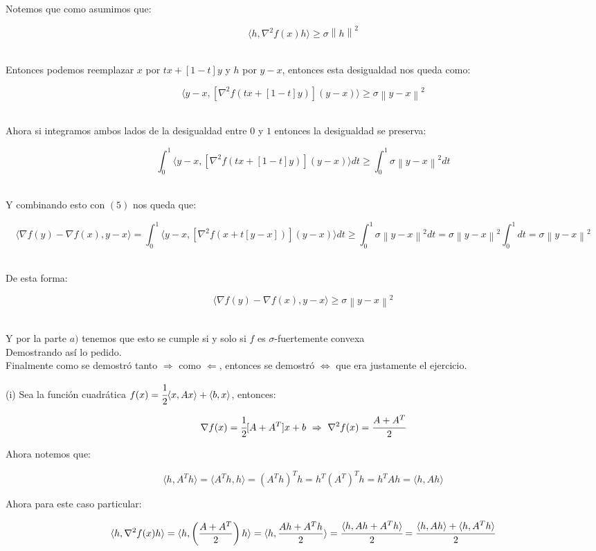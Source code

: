 \documentclass[11pt]{article}
\begin{document}
Notemos que como asumimos que:

\[  \langle h, \nabla^2 f(x) h \rangle \geq \sigma \left\| h \right\|^{2}  \] \

Entonces podemos reemplazar $x$ por $ tx + [1-t]y $ y $h$ por $ y-x$, entonces esta desigualdad nos queda como:

\[  \langle y-x, [\nabla^2 f(tx+[1-t]y)] (y-x) \rangle \geq \sigma \left\| y-x \right\|^{2}  \] \

Ahora si integramos ambos lados de la desigualdad entre $0$ y $1$ entonces la desigualdad se preserva:

\[  \int_{0}^{1} \langle y-x, [\nabla^2 f(tx+[1-t]y)] (y-x) \rangle dt \geq \int_{0}^{1} \sigma \left\| y-x \right\|^{2} dt  \] \

Y combinando esto con $(5)$ nos queda que:

\[ \langle \nabla f(y) - \nabla f(x),y-x \rangle = \int_{0}^{1} \langle y-x, [\nabla^2 f(x+t[y-x])](y-x) \rangle dt \geq \int_{0}^{1} \sigma \left\| y-x \right\|^{2} dt = \sigma \left\| y-x \right\|^{2} \int_{0}^{1}  dt = \sigma \left\| y-x \right\|^{2}  \] \

De esta forma:

\[ \langle \nabla f(y) - \nabla f(x),y-x \rangle \geq  \sigma \left\| y-x \right\|^{2} \] \

Y por la parte $a)$ tenemos que esto se cumple si y solo si $ f $ es $\sigma$-fuertemente convexa \\

Demostrando así lo pedido. \\

Finalmente como se demostró tanto $ \Rightarrow $ como $ \Leftarrow $, entonces se demostró $ \Leftrightarrow $ que era justamente el ejercicio. \\

\hrulefill

(i) Sea la función cuadrática $ f(x) = \cfrac{1}{2} \langle x,Ax \rangle + \langle b,x \rangle $, entonces:

\[ \nabla f(x) = \cfrac{1}{2} [A + A^T]x + b \ \Rightarrow \ \nabla^2 f(x) = \cfrac{A + A^T}{2} \]

Ahora notemos que: \

\[ \langle h, A^T h \rangle = \langle A^T h,h \rangle = (A^T h)^T h = h^T (A^T)^T h = h^T A h = \langle h, Ah \rangle \]

Ahora para este caso particular: \

\[ \langle h, \nabla^2 f(x) h \rangle = \langle h, \left( \frac{A + A^T}{2} \right) h \rangle = \langle h,  \frac{Ah + A^Th}{2}  \rangle = \cfrac{\langle h, Ah + A^Th  \rangle}{2} = \cfrac{\langle h, Ah \rangle + \langle h, A^Th  \rangle}{2}  \]
\end{document}
